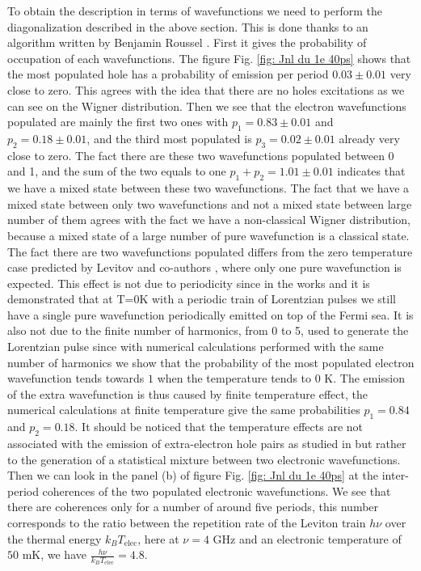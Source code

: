 To obtain the description in terms of wavefunctions we need to perform the diagonalization described in the above section.
This is done thanks to an algorithm written by Benjamin Roussel \cite{roussel2017autopsy}.
First it gives the probability of occupation of each wavefunctions.
The figure Fig. \ref{fig: Jnl du 1e 40ps} shows that the most populated hole has a probability of emission per period $0.03 \pm 0.01$ very close to zero.
This agrees with the idea that there are no holes excitations as we can see on the Wigner distribution.
Then we see that the electron wavefunctions populated are mainly the first two ones with $p_{1} = 0.83 \pm 0.01$ and $p_{2} = 0.18 \pm 0.01$, and the third most populated is $p_{3} = 0.02 \pm 0.01$ already very close to zero.
The fact there are these two wavefunctions populated between 0 and 1, and the sum of the two equals to one $p_{1}+p_{2} = 1.01 \pm 0.01$ indicates that we have a mixed state between these two wavefunctions.
The fact that we have a mixed state between only two wavefunctions and not a mixed state between large number of them agrees with the fact we have a non-classical Wigner distribution, because a mixed state of a large number of pure wavefunction is a classical state.
The fact there are two wavefunctions populated differs from the zero temperature case predicted by Levitov and co-authors \cite{levitov1996electro}, where only one pure wavefunction is expected.
This effect is not due to periodicity since in the works \cite{roussel2017autopsy} and \cite{moskalets2015first,moskalets2017single} it is demonstrated that at T=0K with a periodic train of Lorentzian pulses we still have a single pure wavefunction periodically emitted on top of the Fermi sea.
It is also not due to the finite number of harmonics, from 0 to 5, used to generate the Lorentzian pulse since with numerical calculations performed with the same number of harmonics we show that the probability of the most populated electron wavefunction tends towards $1$ when the temperature tends to $0$ K.
The emission of the extra wavefunction is thus caused by finite temperature effect, the numerical calculations at finite temperature give the same probabilities $p_{1} = 0.84$ and $p_{2} = 0.18$.
It should be noticed that the temperature effects are not associated with the emission of extra-electron hole pairs as studied in \cite{dubois2013minimal} but rather to the generation of a statistical mixture between two electronic wavefunctions.
Then we can look in the panel (b) of figure Fig. \ref{fig: Jnl du 1e 40ps} at the inter-period coherences of the two populated electronic wavefunctions.
We see that there are coherences only for a number of around five periods, this number corresponds to the ratio between the repetition rate of the Leviton train $h\nu$ over the thermal energy $k_{B}T_{\mathrm{elec}}$, here at $\nu = 4$ GHz and an electronic temperature of $50$ mK, we have $\frac{h\nu}{k_{B}T_{\mathrm{elec}}} = 4.8$.


